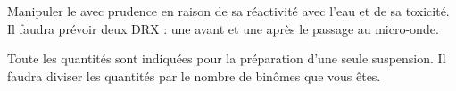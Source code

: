 \documentclass[twoside,a4paper,11pt,addpoints]{exam}%
\begin{document}
\begin{center}
\begin{minipage}{0.20\textwidth}
\centering
\color{red} \Huge\faWarning
\end{minipage}\begin{minipage}{0.80\textwidth}
\color{red} Manipuler le  avec prudence en raison de sa réactivité avec l'eau et de sa toxicité.
Il faudra prévoir deux DRX : une avant et une après le passage au micro-onde.

Toute les quantités sont indiquées pour la préparation d'une seule suspension. Il faudra diviser les quantités par le nombre de binômes que vous êtes.
\end{minipage}
\end{center}
\end{document}
